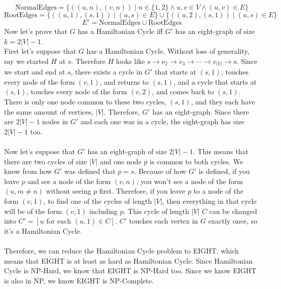 \documentclass[11pt]{article}
\begin{document}
\begin{solution}
\[    \]
    \[ 
        \text{NormalEdges} = \{((u, n), (v, n)) \mid n \in \{1, 2\} \land u, v \in V \land (u, v) \in E\}
    \]
    \[
        \text{RootEdges} = \{((u, 1), (s, 1)) \mid (u, s) \in E\} \cup \{((u, 2), (s, 1)) \mid (u, s) \in E\}
    \]
    \[
        E' = \text{NormalEdges} \cup \text{RootEdges}
    \]
    Now let's prove that $G$ has a Hamiltonian Cycle iff $G'$ has an eight-graph of size $k = 2|V| - 1$.
    \\ First let's suppose that $G$ has a Hamiltonian Cycle. Without loss of generality, say we started $H$ at $s$. Therefore $H$ looks like $s \rightarrow v_2 \rightarrow v_3 \rightarrow \cdots \rightarrow v_{|V|} \rightarrow s$. Since we start and end at $s$, there exists a cycle in $G'$ that starts at $(s, 1)$, touches every node of the form $(v, 1)$, and returns to $(s, 1)$, and a cycle that starts at $(s, 1)$, touches every node of the form $(v, 2)$, and comes back to $(s, 1)$. There is only one node common to these two cycles, $(s, 1)$, and they each have the same amount of vertices, $|V|$. Therefore, $G'$ has an eight-graph. Since there are $2|V| - 1$ nodes in $G'$ and each one was in a cycle, the eight-graph has size $2|V| - 1$ too.
    \\ \\ Now let's suppose that $G'$ has an eight-graph of size $2|V| - 1$. This means that there are two cycles of size $|V|$ and one node $p$ is common to both cycles. We know from how $G'$ was defined that $p = s$. Because of how $G'$ is defined, if you leave $p$ and see a node of the form $(v, n)$, you won't see a node of the form $(u, m \not = n)$ without seeing $p$ first. Therefore, if you leave $p$ to a node of the form $(v, 1)$, to find one of the cycles of length $|V|$, then everything in that cycle will be of the form $(v, 1)$ including $p$. This cycle of length $|V|$ $C$ can be changed into $C' = [u\text{ for each } (u, 1) \in C]$. $C'$ touches each vertex in $G$ exactly once, so it's a Hamiltonian Cycle.
    \\\\ Therefore, we can reduce the Hamiltonian Cycle problem to EIGHT, which means that EIGHT is at least as hard as Hamiltonian Cycle. Since Hamiltonian Cycle is NP-Hard, we know that EIGHT is NP-Hard too. Since we know EIGHT is also in NP, we know EIGHT is NP-Complete.

\end{solution}

\end{document}
